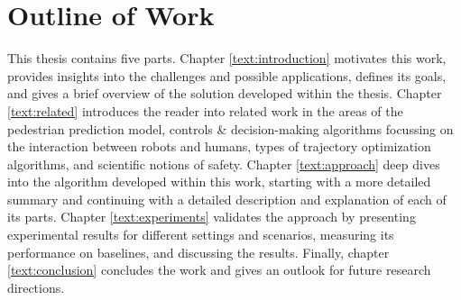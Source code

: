 \section{Outline of Work}
\label{text:introduction/outline}
This thesis contains five parts. Chapter \ref{text:introduction} motivates this work, provides insights into the challenges and possible applications, defines its goals, and gives a brief overview of the solution developed within the thesis. Chapter \ref{text:related} introduces the reader into related work in the areas of the pedestrian prediction model, controls \& decision-making algorithms focussing on the interaction between robots and humans, types of trajectory optimization algorithms, and scientific notions of safety. Chapter \ref{text:approach} deep dives into the algorithm developed within this work, starting with a more detailed summary and continuing with a detailed description and explanation of each of its parts. Chapter \ref{text:experiments} validates the approach by presenting experimental results for different settings and scenarios, measuring its performance on baselines, and discussing the results. Finally, chapter \ref{text:conclusion} concludes the work and gives an outlook for future research directions.
